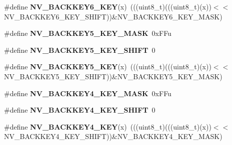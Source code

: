 \begin{DoxyCompactItemize}
\item 
\#define {\bfseries N\+V\+\_\+\+B\+A\+C\+K\+K\+E\+Y6\+\_\+\+K\+EY}(x)~(((uint8\+\_\+t)(((uint8\+\_\+t)(x))$<$$<$N\+V\+\_\+\+B\+A\+C\+K\+K\+E\+Y6\+\_\+\+K\+E\+Y\+\_\+\+S\+H\+I\+FT))\&N\+V\+\_\+\+B\+A\+C\+K\+K\+E\+Y6\+\_\+\+K\+E\+Y\+\_\+\+M\+A\+SK)\hypertarget{group__NV__Register__Masks_ga0dc772c12f13eb390c75b52f2110f0f1}{}\label{group__NV__Register__Masks_ga0dc772c12f13eb390c75b52f2110f0f1}

\item 
\#define {\bfseries N\+V\+\_\+\+B\+A\+C\+K\+K\+E\+Y5\+\_\+\+K\+E\+Y\+\_\+\+M\+A\+SK}~0x\+F\+Fu\hypertarget{group__NV__Register__Masks_gab1e58bd037f31bcaa1b96a71340315ba}{}\label{group__NV__Register__Masks_gab1e58bd037f31bcaa1b96a71340315ba}

\item 
\#define {\bfseries N\+V\+\_\+\+B\+A\+C\+K\+K\+E\+Y5\+\_\+\+K\+E\+Y\+\_\+\+S\+H\+I\+FT}~0\hypertarget{group__NV__Register__Masks_ga68762e18611e6dfaed3ddfd7847c09f4}{}\label{group__NV__Register__Masks_ga68762e18611e6dfaed3ddfd7847c09f4}

\item 
\#define {\bfseries N\+V\+\_\+\+B\+A\+C\+K\+K\+E\+Y5\+\_\+\+K\+EY}(x)~(((uint8\+\_\+t)(((uint8\+\_\+t)(x))$<$$<$N\+V\+\_\+\+B\+A\+C\+K\+K\+E\+Y5\+\_\+\+K\+E\+Y\+\_\+\+S\+H\+I\+FT))\&N\+V\+\_\+\+B\+A\+C\+K\+K\+E\+Y5\+\_\+\+K\+E\+Y\+\_\+\+M\+A\+SK)\hypertarget{group__NV__Register__Masks_ga07bc019ba659fc1b38053c8f191371b6}{}\label{group__NV__Register__Masks_ga07bc019ba659fc1b38053c8f191371b6}

\item 
\#define {\bfseries N\+V\+\_\+\+B\+A\+C\+K\+K\+E\+Y4\+\_\+\+K\+E\+Y\+\_\+\+M\+A\+SK}~0x\+F\+Fu\hypertarget{group__NV__Register__Masks_ga49a74f76cf8b7787284ac6e510e4e0c3}{}\label{group__NV__Register__Masks_ga49a74f76cf8b7787284ac6e510e4e0c3}

\item 
\#define {\bfseries N\+V\+\_\+\+B\+A\+C\+K\+K\+E\+Y4\+\_\+\+K\+E\+Y\+\_\+\+S\+H\+I\+FT}~0\hypertarget{group__NV__Register__Masks_gadfa9b097c522673010b11e94a5a7b9eb}{}\label{group__NV__Register__Masks_gadfa9b097c522673010b11e94a5a7b9eb}

\item 
\#define {\bfseries N\+V\+\_\+\+B\+A\+C\+K\+K\+E\+Y4\+\_\+\+K\+EY}(x)~(((uint8\+\_\+t)(((uint8\+\_\+t)(x))$<$$<$N\+V\+\_\+\+B\+A\+C\+K\+K\+E\+Y4\+\_\+\+K\+E\+Y\+\_\+\+S\+H\+I\+FT))\&N\+V\+\_\+\+B\+A\+C\+K\+K\+E\+Y4\+\_\+\+K\+E\+Y\+\_\+\+M\+A\+SK)\hypertarget{group__NV__Register__Masks_gaec4a23e778980f71beab56e3353a0abb}{}\label{group__NV__Register__Masks_gaec4a23e778980f71beab56e3353a0abb}


\end{DoxyCompactItemize}
